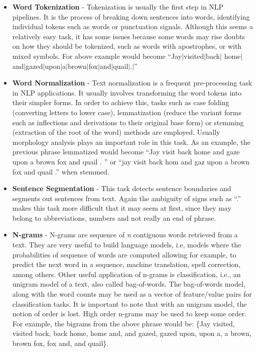 \begin{itemize}
		\item \textbf{Word Tokenization} - Tokenization is usually the first step in NLP pipelines. It is the process of breaking down sentences into words, identifying individual tokens such as words or punctuation signals. Although this seems a relatively easy task, it has some issues because some words may rise doubts on how they should be tokenized, such as words with apostrophes, or with mixed symbols. For above example would become ``Jay$|$visited$|$back$|$ home$|$and$|$gazed$|$upon$|$a$|$brown$|$fox$|$and$|$quail$|$.$|$'' 
        \item \textbf{Word Normalization} - Text normalization is a frequent pre-processing task in NLP applications. It usually involves transforming the word tokens into their simpler forms. In order to achieve this, tasks such as case folding (converting letters to lower case), lemmatization (reduce the variant forms such as inflections and derivations to their original base form) or stemming (extraction of the root of the word) methods are employed. Usually morphology analysis plays an important role in this task. As an example, the previous phrase lemmatized would become ``Jay visit back home and gaze upon a brown fox and quail . '' or ``jay visit back hom and gaz upon a brown fox and quail .'' when stemmed.  
        \item \textbf{Sentence Segmentation} - This task detects sentence boundaries and segments out sentences from text. Again the ambiguity of signs such as ``.'' makes this task more difficult that it may seem at first, since they may belong to abbreviations, numbers and not really an end of phrase. 
        \item \textbf{N-grams} - N-grams are sequence of \textit{n} contiguous words retrieved from a text. They are very useful to build language models, i.e, models where the probabilities of sequence of words are computed allowing for example, to predict the next word in a sequence, machine translation, spell correction, among others. Other useful application of n-grams is classification, i.e., an unigram model of a text, also called bag-of-words. The bag-of-words model, along with the word counts may be used as a vector of feature/value pairs for classification tasks. It is important to note that with an unigram model, the notion of order is lost. High order n-grams may be used to keep some order. For example, the bigrams from the above phrase would be: \{Jay visited, visited back, back home, home and, and gazed, gazed upon, upon a, a brown, brown fox, fox and, and quail\}.        

\end{itemize}
